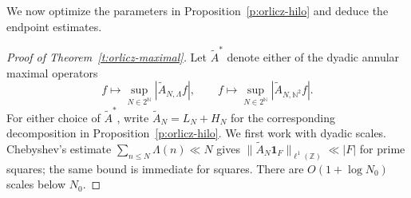 \documentclass[12pt,reqno]{amsart}
\numberwithin{equation}{section}
\theoremstyle{definition}
\theoremstyle{remark}
\begin{document}
We now optimize the parameters in
Proposition~\ref{p:orlicz-hilo} and deduce the endpoint estimates.

\begin{proof}[Proof of Theorem~\ref{t:orlicz-maximal}]
Let \(\widetilde A^*\) denote either of the dyadic annular maximal
operators
\[
 f\longmapsto
 \sup_{N\in2^{\mathbb N}}|\widetilde A_{N,\Lambda}f|,
 \qquad
 f\longmapsto
 \sup_{N\in2^{\mathbb N}}|\widetilde A_{N,\mathbb N^2}f|.
\]
For either choice of \(\widetilde A^*\), write
\(\widetilde A_N=L_N+H_N\) for the corresponding decomposition in
Proposition~\ref{p:orlicz-hilo}.  We first work with dyadic scales.
Chebyshev's estimate \(\sum_{n\leq N}\Lambda(n)\ll N\) gives
\(\|\widetilde A_N\mathbf1_F\|_{\ell^1(\mathbb Z)}\ll|F|\)
for prime squares; the same bound is immediate for squares.
There are \(O(1+\log N_0)\) scales below \(N_0\).


\end{proof}
\end{document}
